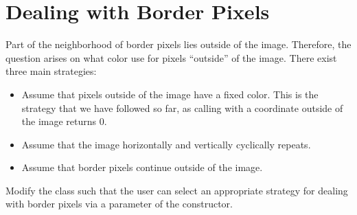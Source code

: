 \documentclass{book}
\begin{document}


\section{Dealing with Border Pixels}\label{sec:border-pixels}
Part of the neighborhood of border pixels lies outside of the image. Therefore, the question arises on what color use for pixels ``outside'' of the image. There exist three main strategies: 
\begin{itemize}
  \item Assume that pixels outside of the image have a fixed color. This is the strategy that we have followed so far, as calling  with a coordinate outside of the image returns 0.
  \item Assume that the image horizontally and vertically cyclically repeats. 
  \item Assume that border pixels continue outside of the image.
\end{itemize}

\begin{exercise}
Modify the class  such that the user can select an appropriate strategy for dealing with border pixels via a parameter of the constructor. 
\end{exercise}

%
\end{document}

